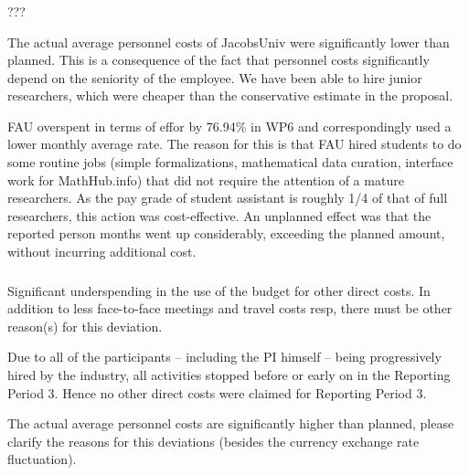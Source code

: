 

\subsubsection{}

\begin{EUcomment}
  ???
\end{EUcomment}

The actual average personnel costs of JacobsUniv were significantly
lower than planned. This is a consequence of the fact that personnel
costs significantly depend on the seniority of the employee. We have
been able to hire junior researchers, which were cheaper than the
conservative estimate in the proposal.

FAU overspent in terms of effor by 76.94\% in WP6 and correspondingly used a lower monthly
average rate. The reason for this is that FAU hired students to do some routine jobs
(simple formalizations, mathematical data curation, interface work for MathHub.info) that
did not require the attention of a mature researchers. As the pay grade of student
assistant is roughly 1/4 of that of full researchers, this action was cost-effective. An
unplanned effect was that the reported person months went up considerably, exceeding the
planned amount, without incurring additional cost.


\subsubsection{}
\begin{EUcomment}
  Significant underspending in the use of the budget for other direct
  costs. In addition to less face-to-face meetings and travel costs
  resp, there must be other reason(s) for this deviation.
\end{EUcomment}

Due to all of the  participants -- including the PI
himself -- being progressively hired by the industry, all activities
stopped before or early on in the Reporting Period 3. Hence no
other direct costs were claimed for Reporting Period 3.

\begin{EUcomment}
  The actual average personnel costs are significantly higher than
  planned, please clarify the reasons for this deviations (besides the
  currency exchange rate fluctuation).
\end{EUcomment}


